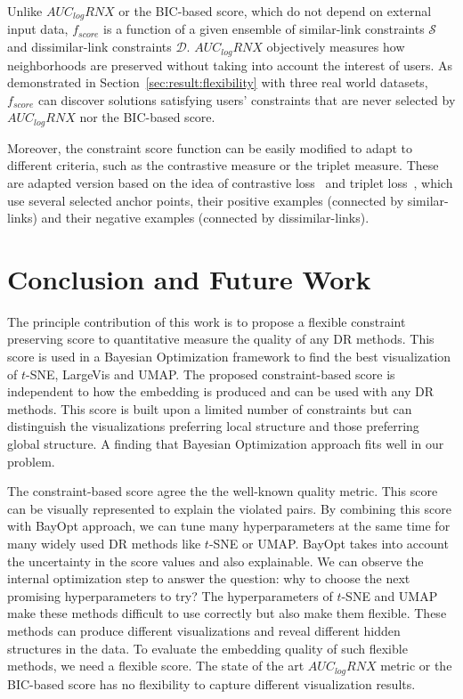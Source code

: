 Unlike $AUC_{log}RNX$ or the BIC-based score, which do not depend on external input data, $f_{score}$ is a function of a given ensemble of similar-link constraints $\mathcal{S}$ and dissimilar-link constraints $\mathcal{D}$.
$AUC_{log}RNX$ objectively measures how neighborhoods are preserved without taking into account the interest of users.
As demonstrated in Section~\ref{sec:result:flexibility} with three real world datasets, $f_{score}$ can discover solutions satisfying users' constraints that are never selected by $AUC_{log}RNX$ nor the BIC-based score.

Moreover, the constraint score function can be easily modified to adapt to different criteria, such as the contrastive measure or the triplet measure.
These are adapted version based on the idea of contrastive loss~\cite{logeswaran2018efficient} and triplet loss~\cite{schroff2015facenet}, which use several selected anchor points, their positive examples (connected by similar-links) and their negative examples (connected by dissimilar-links).

\section{Conclusion and Future Work}\label{sec:conclusion}

The principle contribution of this work is to propose a flexible constraint preserving score to quantitative measure the quality of any DR methods.
This score is used in a Bayesian Optimization framework to find the best visualization of $t$-SNE, LargeVis and UMAP.
The proposed constraint-based score is independent to how the embedding is produced and can be used with any DR methods.
This score is built upon a limited number of constraints but can distinguish the visualizations preferring local structure and those preferring global structure.
A finding that Bayesian Optimization approach fits well in our problem.

The constraint-based score agree the the well-known quality metric.
This score can be visually represented to explain the violated pairs.
By combining this score with BayOpt approach, we can tune many hyperparameters at the same time for many widely used DR methods like $t$-SNE or UMAP.
BayOpt takes into account the uncertainty in the score values and also explainable. We can observe the internal optimization step to answer the question: why to choose the next promising hyperparameters to try?
The hyperparameters of $t$-SNE and UMAP make these methods difficult to use correctly but also make them flexible.
These methods can produce different visualizations and reveal different hidden structures in the data.
To evaluate the embedding quality of such flexible methods, we need a flexible score.
The state of the art $AUC_{log}RNX$ metric or the BIC-based score has no flexibility to capture different visualization results.

